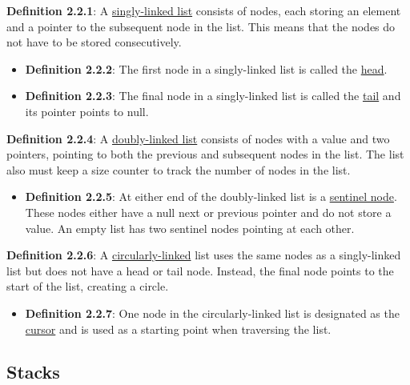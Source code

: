 \documentclass{article}
\newcommand{\separate}[1] {\vspace{#1 pt}\noindent}
\newcommand{\definition}[2]{\textbf{Definition #1}: #2\label{def:#1}}
\begin{document}
\separate{7}\definition{2.2.1}{A \underline{singly-linked list} consists of nodes, each storing an element and a pointer to the subsequent node in the list. This means that the nodes do not have to be stored consecutively.}
\begin{itemize}
    \item \definition{2.2.2}{The first node in a singly-linked list is called the \underline{head}.}
    \item \definition{2.2.3}{The final node in a singly-linked list is called the \underline{tail} and its pointer points to null.}
\end{itemize}
\definition{2.2.4}{A \underline{doubly-linked list} consists of nodes with a value and two pointers, pointing to both the previous and subsequent nodes in the list. The list also must keep a size counter to track the number of nodes in the list.}
\begin{itemize}
    \item \definition{2.2.5}{At either end of the doubly-linked list is a \underline{sentinel node}. These nodes either have a null next or previous pointer and do not store a value. An empty list has two sentinel nodes pointing at each other.}
\end{itemize}
\definition{2.2.6}{A \underline{circularly-linked} list uses the same nodes as a singly-linked list but does not have a head or tail node. Instead, the final node points to the start of the list, creating a circle.}
\begin{itemize}
    \item \definition{2.2.7}{One node in the circularly-linked list is designated as the \underline{cursor} and is used as a starting point when traversing the list.}
\end{itemize}

\subsection{Stacks}
\end{document}
